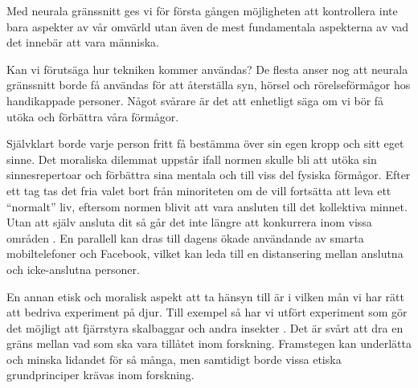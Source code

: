 \documentclass[12pt, a4paper]{article}
\begin{document}
Med neurala gränssnitt ges vi för första gången möjligheten att kontrollera inte
bara aspekter av vår omvärld utan även de mest fundamentala aspekterna av vad
det innebär att vara människa.

Kan vi förutsäga hur tekniken kommer användas? De flesta anser nog att neurala
gränssnitt borde få användas för att återställa syn, hörsel och rörelseförmågor
hos handikappade personer. Något svårare är det att enhetligt säga om vi bör få
utöka och förbättra våra förmågor.

Självklart borde varje person fritt få bestämma över sin egen kropp och sitt
eget sinne. Det moraliska dilemmat uppstår ifall normen skulle bli att utöka sin
sinnesrepertoar och förbättra sina mentala och till viss del fysiska förmågor.
Efter ett tag tas det fria valet bort från minoriteten om de vill fortsätta att
leva ett ``normalt'' liv, eftersom normen blivit att vara ansluten till det
kollektiva minnet. Utan att själv ansluta dit så går det inte längre att
konkurrera inom vissa områden \cite{ethics_eu} \cite{ethics1}. En parallell kan
dras till dagens ökade användande av smarta mobiltelefoner och Facebook, vilket
kan leda till en distansering mellan anslutna och icke-anslutna personer.

En annan etisk och moralisk aspekt att ta hänsyn till är i vilken mån vi har
rätt att bedriva experiment på djur. Till exempel så har vi utfört experiment
som gör det möjligt att fjärrstyra skalbaggar och andra insekter \cite{ethics2}.
Det är svårt att dra en gräns mellan vad som ska vara tillåtet inom forskning.
Framstegen kan underlätta och minska lidandet för så många, men samtidigt borde
vissa etiska grundprinciper krävas inom forskning.







%
%




\pagebreak


\end{document}
